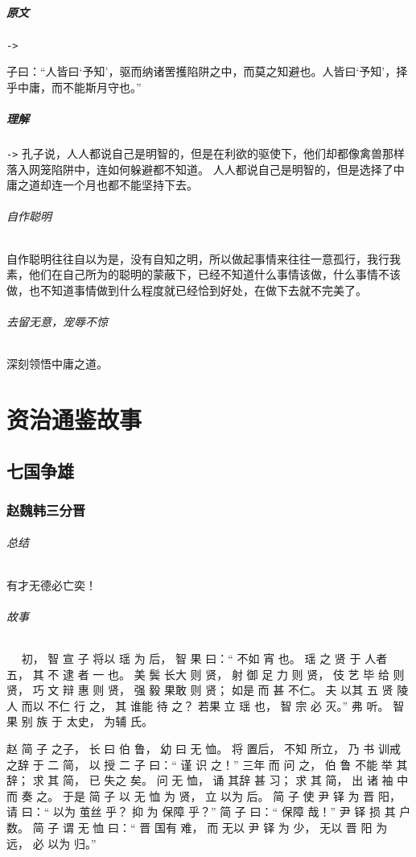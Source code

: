 \documentclass[UTF8,a4paper,8pt]{ctexbook}
\begin{document}
			\paragraph{原文}\verb|->|
					
				子曰：“人皆曰‘予知’，驱而纳诸罟擭陷阱之中，而莫之知避也。人皆曰‘予知’，择乎中庸，而不能斯月守也。”
			\paragraph{理解}\verb|->|
				孔子说，人人都说自己是明智的，但是在利欲的驱使下，他们却都像禽兽那样落入网笼陷阱中，连如何躲避都不知道。
				人人都说自己是明智的，但是选择了中庸之道却连一个月也都不能坚持下去。
			
				
				\subparagraph{自作聪明} 自作聪明往往自以为是，没有自知之明，所以做起事情来往往一意孤行，我行我素，他们在自己所为的聪明的蒙蔽下，已经不知道什么事情该做，什么事情不该做，也不知道事情做到什么程度就已经恰到好处，在做下去就不完美了。
				
				\subparagraph{去留无意，宠辱不惊}深刻领悟中庸之道。	
\chapter{资治通鉴故事}
	\section{七国争雄}
		\subsection{赵魏韩三分晋}
			\subparagraph{总结}有才无德必亡奕！
			
			\subparagraph{故事}
				　 初， 智 宣 子 将以 瑶 为 后， 智 果 曰：“ 不如 宵 也。 瑶 之 贤 于 人者 五， 其 不 逮 者 一 也。 美 鬓 长大 则 贤， 射 御 足 力 则 贤， 伎 艺 毕 给 则 贤， 巧 文 辩 惠 则 贤， 强 毅 果敢 则 贤； 如是 而 甚 不仁。 夫 以其 五 贤 陵 人 而以 不仁 行 之， 其 谁能 待 之？ 若果 立 瑶 也， 智 宗 必 灭。” 弗 听。 智 果 别 族 于 太史， 为辅 氏。
				
				  赵 简 子 之子， 长 曰 伯 鲁， 幼 曰 无 恤。 将 置后， 不知 所立， 乃 书 训戒 之辞 于 二 简， 以 授 二 子 曰：“ 谨 识 之！” 三年 而 问 之， 伯 鲁 不能 举 其辞； 求 其 简， 已 失之 矣。 问 无 恤， 诵 其辞 甚 习； 求 其 简， 出 诸 袖 中 而 奏 之。 于是 简 子 以 无 恤 为 贤， 立 以为 后。 简 子 使 尹 铎 为 晋 阳， 请 曰：“ 以为 茧丝 乎？ 抑 为 保障 乎？” 简 子 曰：“ 保障 哉！” 尹 铎 损 其 户数。 简 子 谓 无 恤 曰：“ 晋 国有 难， 而 无以 尹 铎 为 少， 无以 晋 阳 为 远， 必 以为 归。” 
				  
\end{document}
